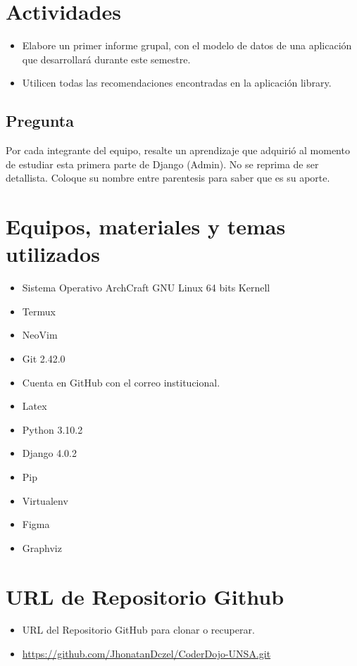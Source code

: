 \section{Actividades}
\begin{itemize}
	\item Elabore un primer informe grupal, con el modelo de datos de una aplicación que desarrollará durante este semestre.
	\item Utilicen todas las recomendaciones encontradas en la aplicación library.
\end{itemize}

\subsection{Pregunta}
Por cada integrante del equipo, resalte un aprendizaje que adquirió al momento de estudiar esta primera parte de Django (Admin). No se reprima de ser detallista. Coloque su nombre entre parentesis para saber que es su aporte.

	\section{Equipos, materiales y temas utilizados}
	\begin{itemize}
		\item Sistema Operativo ArchCraft GNU Linux 64 bits Kernell
		\item Termux
		\item NeoVim
		\item Git 2.42.0
		\item Cuenta en GitHub con el correo institucional.
    \item Latex
    \item Python 3.10.2
		\item Django 4.0.2
		\item Pip
		\item Virtualenv
		\item Figma
		\item Graphviz
	\end{itemize}

	\section{URL de Repositorio Github}
	\begin{itemize}
            \item URL del Repositorio GitHub para clonar o recuperar.
            \item \url{https://github.com/JhonatanDczel/CoderDojo-UNSA.git}
	\end{itemize}
